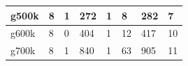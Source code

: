 \documentclass[12pt,psfig,a4]{article}
\begin{document}
\begin{table}[ht]
\begin{center}
\begin{tabular}{|l|l|l|l|l|l|l|l|}
g500k& \hspace{0.2in}8 & \hspace{0.2in}1 & \hspace{0.2in}272& \hspace{0.2in}1& \hspace{0.2in}8& \hspace{0.2in}282& \hspace{0.2in}7   \\ \hline 
g600k& \hspace{0.2in}8 & \hspace{0.2in}0 & \hspace{0.2in}404& \hspace{0.2in}1& \hspace{0.2in}12& \hspace{0.2in}417& \hspace{0.2in}10 \\ \hline 
g700k& \hspace{0.2in}8 & \hspace{0.2in}1 & \hspace{0.2in}840& \hspace{0.2in}1& \hspace{0.2in}63& \hspace{0.2in}905& \hspace{0.2in}11 \\ \hline 
\end {tabular}
\end {center}
\end {table}
\normalsize
\newpage
\end{document}
